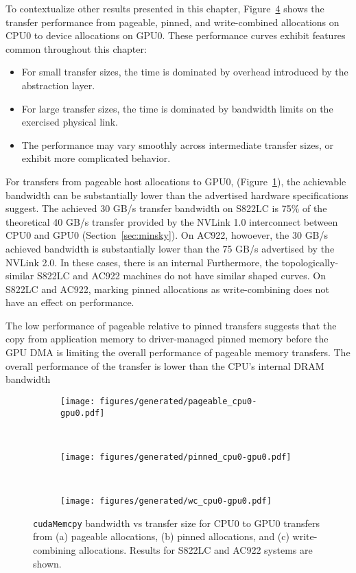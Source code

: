 To contextualize other results presented in this chapter, Figure~\ref{fig:pageable-pinned-wc} shows the transfer performance from pageable, pinned, and write-combined allocations on CPU0 to device allocations on GPU0.
These performance curves exhibit features common throughout this chapter:
\begin{itemize}
\item For small transfer sizes, the time is dominated by overhead introduced by the abstraction layer.
\item For large transfer sizes, the time is dominated by bandwidth limits on the exercised physical link.
\item The performance may vary smoothly across intermediate transfer sizes, or exhibit more complicated behavior.
\end{itemize}

For transfers from pageable host allocations to GPU0, (Figure~\ref{fig:pageable-cpu0-gpu0}), the achievable bandwidth can be substantially lower than the advertised hardware specifications suggest.
The achieved 30 GB/s transfer bandwidth on S822LC is 75\% of the theoretical 40 GB/s transfer provided by the NVLink 1.0 interconnect between CPU0 and GPU0 (Section~\ref{sec:minsky}).
On AC922, howoever, the 30 GB/s achieved bandwidth is substantially lower than the 75 GB/s advertised by the NVLink 2.0.
In these cases, there is an internal
Furthermore, the topologically-similar S822LC and AC922 machines do not have similar shaped curves.
On S822LC and AC922, marking pinned allocations as write-combining does not have an effect on performance.

The low performance of pageable relative to pinned transfers suggests that the copy from application memory to driver-managed pinned memory before the GPU DMA is limiting the overall performance of pageable memory transfers.
The overall performance of the transfer is lower than the CPU's internal DRAM bandwidth

\begin{figure}[ht]
    \centering
    \begin{subfigure}[b]{0.3\textwidth}
        \texttt{[image: figures/generated/pageable\_cpu0-gpu0.pdf]}
        \caption{}
        \label{fig:pageable-cpu0-gpu0}
    \end{subfigure}
    ~
    \begin{subfigure}[b]{0.3\textwidth}
        \texttt{[image: figures/generated/pinned\_cpu0-gpu0.pdf]}
        \caption{}
        \label{fig:}
    \end{subfigure}
    ~
    \begin{subfigure}[b]{0.3\textwidth}
        \texttt{[image: figures/generated/wc\_cpu0-gpu0.pdf]}
        \caption{}
        \label{fig:}
    \end{subfigure}
    \caption[]{
        \texttt{cudaMemcpy} bandwidth vs transfer size for CPU0 to GPU0 transfers from 
        (a) pageable allocations,
        (b) pinned allocations, and
        (c) write-combining allocations.
        Results for S822LC and AC922 systems are shown.
    }
    \label{fig:pageable-pinned-wc}
\end{figure}

